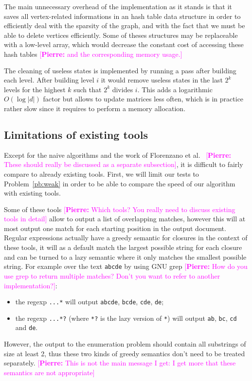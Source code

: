 \documentclass[12px]{article}
\theoremstyle{definition}
\newcommand{\pierre}[1]{\textcolor{magenta}{[\textbf{Pierre:} #1]}}
\begin{document}
      The main unnecessary overhead of the implementation as it stands is that it
      saves all vertex-related informations in an hash table data
      structure in order to
      efficiently deal with the sparsity of the graph, and with the fact that we must be
      able to delete vertices efficiently. Some of theses structures may be
      replaceable with a low-level array, which would decrease the constant
      cost of accessing these hash tables \pierre{and the corresponding
      memory usage.}

      The cleaning of useless states is implemented by running a pass after
      building each level. After building level $i$ it would remove useless
      states in the last $2^k$ levels for the highest $k$ such that $2^k$
      divides $i$. This adds a logarithmic $O(\log |d|)$ factor but allows to
      update  matrices less often, which is in practice rather
      slow since it requires to perform a memory allocation.

    \subsection{Limitations of existing tools}

      Except for the naive algorithms and the work of Florenzano et 
      al.~\cite{florenzano2018constant} \pierre{These should really be
      discussed as a separate subsection}, it is difficult to fairly compare to
      already existing tools. First, we will limit our tests to
      Problem~\ref{pb:weak} in order to be able to compare the speed of our
      algorithm with existing tools.

      Some of these tools \pierre{Which tools? You really need to discuss
      existing tools in detail} allow to output a list of overlapping matches,
      however this will at most output one match for each starting position in
      the output document. Regular expressions actually have a greedy semantic for closures
      in the context of these tools, it will as a default match the largest
      possible string for each closure and can be turned to a lazy semantic
      where it only matches the smallest possible string. For example over the
      text \texttt{abcde} by using GNU grep \pierre{How do
      you use grep to return multiple matches? Don't you want to refer to
      another implementation?}:
        \begin{itemize}
          \item the regexp \texttt{...*} will output \texttt{abcde},
            \texttt{bcde}, \texttt{cde}, \texttt{de};
          \item the regexp \texttt{...*?} (where \texttt{*?} is the lazy
            version of \texttt{*}) will output \texttt{ab}, \texttt{bc},
            \texttt{cd} and \texttt{de}.
        \end{itemize}
      However, the output to the enumeration problem should contain all
      substrings of size at least 2, thus these two kinds of greedy semantics
      don't need to be treated separately. \pierre{This is not the main
      message I get: I get more that these semantics are not appropriate}
\end{document}
